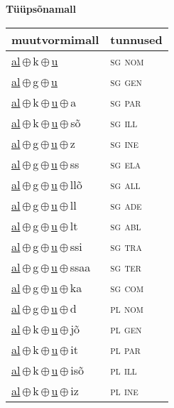 

\vspace{3.5em}
\noindent \begin{minipage}{\textwidth}
\noindent \textbf{Tüüpsõnamall \,}\\

\begin{sideways}
\begin{tabular}{l l}
muutvormimall & tunnused \\
\hline
\underline{al}\,$\oplus$\,k\,$\oplus$\,\underline{u} & \textsc{ sg nom } \\
\underline{al}\,$\oplus$\,g\,$\oplus$\,\underline{u} & \textsc{ sg gen } \\
\underline{al}\,$\oplus$\,k\,$\oplus$\,\underline{u}\,$\oplus$\,a & \textsc{ sg par } \\
\underline{al}\,$\oplus$\,k\,$\oplus$\,\underline{u}\,$\oplus$\,sõ & \textsc{ sg ill } \\
\underline{al}\,$\oplus$\,g\,$\oplus$\,\underline{u}\,$\oplus$\,z & \textsc{ sg ine } \\
\underline{al}\,$\oplus$\,g\,$\oplus$\,\underline{u}\,$\oplus$\,ss & \textsc{ sg ela } \\
\underline{al}\,$\oplus$\,g\,$\oplus$\,\underline{u}\,$\oplus$\,llõ & \textsc{ sg all } \\
\underline{al}\,$\oplus$\,g\,$\oplus$\,\underline{u}\,$\oplus$\,ll & \textsc{ sg ade } \\
\underline{al}\,$\oplus$\,g\,$\oplus$\,\underline{u}\,$\oplus$\,lt & \textsc{ sg abl } \\
\underline{al}\,$\oplus$\,g\,$\oplus$\,\underline{u}\,$\oplus$\,ssi & \textsc{ sg tra } \\
\underline{al}\,$\oplus$\,g\,$\oplus$\,\underline{u}\,$\oplus$\,ssaa & \textsc{ sg ter } \\
\underline{al}\,$\oplus$\,g\,$\oplus$\,\underline{u}\,$\oplus$\,ka & \textsc{ sg com } \\
\underline{al}\,$\oplus$\,g\,$\oplus$\,\underline{u}\,$\oplus$\,d & \textsc{ pl nom } \\
\underline{al}\,$\oplus$\,k\,$\oplus$\,\underline{u}\,$\oplus$\,jõ & \textsc{ pl gen } \\
\underline{al}\,$\oplus$\,k\,$\oplus$\,\underline{u}\,$\oplus$\,it & \textsc{ pl par } \\
\underline{al}\,$\oplus$\,k\,$\oplus$\,\underline{u}\,$\oplus$\,isõ & \textsc{ pl ill } \\
\underline{al}\,$\oplus$\,k\,$\oplus$\,\underline{u}\,$\oplus$\,iz & \textsc{ pl ine } \\

\end{tabular}
\end{sideways}
\end{minipage}
